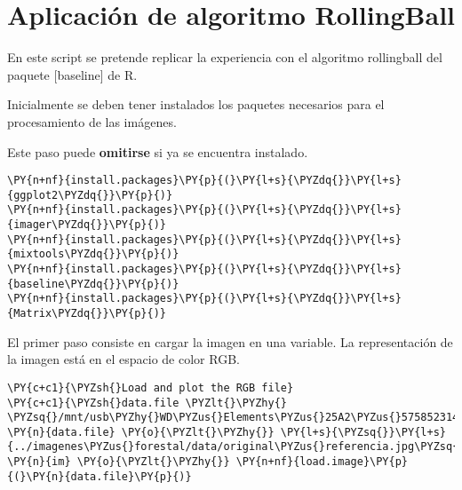     
    \hypertarget{aplicaciuxf3n-de-algoritmo-rollingball}{%
\section{Aplicación de algoritmo
RollingBall}\label{aplicaciuxf3n-de-algoritmo-rollingball}}

En este script se pretende replicar la experiencia con el algoritmo
rollingball del paquete {[}baseline{]} de R.

    Inicialmente se deben tener instalados los paquetes necesarios para el
procesamiento de las imágenes.

Este paso puede \textbf{omitirse} si ya se encuentra instalado.

    \begin{tcolorbox}[breakable, size=fbox, boxrule=1pt, pad at break*=1mm,colback=cellbackground, colframe=cellborder]
\begin{Verbatim}[commandchars=\\\{\}]
\PY{n+nf}{install.packages}\PY{p}{(}\PY{l+s}{\PYZdq{}}\PY{l+s}{ggplot2\PYZdq{}}\PY{p}{)}
\PY{n+nf}{install.packages}\PY{p}{(}\PY{l+s}{\PYZdq{}}\PY{l+s}{imager\PYZdq{}}\PY{p}{)}
\PY{n+nf}{install.packages}\PY{p}{(}\PY{l+s}{\PYZdq{}}\PY{l+s}{mixtools\PYZdq{}}\PY{p}{)}
\PY{n+nf}{install.packages}\PY{p}{(}\PY{l+s}{\PYZdq{}}\PY{l+s}{baseline\PYZdq{}}\PY{p}{)}
\PY{n+nf}{install.packages}\PY{p}{(}\PY{l+s}{\PYZdq{}}\PY{l+s}{Matrix\PYZdq{}}\PY{p}{)}
\end{Verbatim}
\end{tcolorbox}

   

    El primer paso consiste en cargar la imagen en una variable. La
representación de la imagen está en el espacio de color RGB.

    \begin{tcolorbox}[breakable, size=fbox, boxrule=1pt, pad at break*=1mm,colback=cellbackground, colframe=cellborder]
\begin{Verbatim}[commandchars=\\\{\}]
\PY{c+c1}{\PYZsh{}Load and plot the RGB file}
\PY{c+c1}{\PYZsh{}data.file \PYZlt{}\PYZhy{} \PYZsq{}/mnt/usb\PYZhy{}WD\PYZus{}Elements\PYZus{}25A2\PYZus{}575852314531383859503438\PYZhy{}0:0\PYZhy{}part1/CHB/PASANTIA/imagenes\PYZus{}forestal/data/DJI\PYZus{}0805.jpg\PYZsq{}}
\PY{n}{data.file} \PY{o}{\PYZlt{}\PYZhy{}} \PY{l+s}{\PYZsq{}}\PY{l+s}{../imagenes\PYZus{}forestal/data/original\PYZus{}referencia.jpg\PYZsq{}}
\PY{n}{im} \PY{o}{\PYZlt{}\PYZhy{}} \PY{n+nf}{load.image}\PY{p}{(}\PY{n}{data.file}\PY{p}{)}
\end{Verbatim}
\end{tcolorbox}

